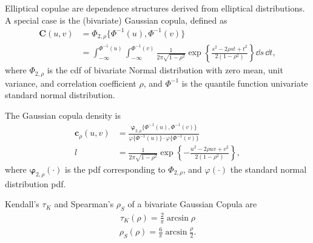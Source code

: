 Elliptical copulae are dependence structures derived from elliptical
distributions. A special case is the (bivariate) Gaussian copula,
defined as 
\begin{align}
  \bm{C}(u,v) &= \Phi_{2, \rho}\{\Phi^{-1}(u), \Phi^{-1}(v)\} \nonumber \\
              &= \int_{-\infty}^{\Phi^{-1}(u)}
                \int_{-\infty}^{\Phi^{-1}(v)}
                \frac{1}{2\pi\sqrt{1-\rho^2}}
                \exp{\left\{
                \frac{s^2-2\rho st+t^2}{2(1-\rho^2)}
                \right\}} \dd s\, \dd t,
\end{align}
where $\Phi_{2, \rho}$ is the cdf of bivariate Normal distribution
with zero mean, unit variance, and correlation coefficient $\rho$, and
$\Phi^{-1}$ is the quantile function univariate standard normal
distribution.  

The Gaussian copula density is
\begin{align}
  \bm{c}_\rho(u,v) &= \frac{\bm{\varphi}_{2,\rho}\{\Phi^{-1}(u), \Phi^{-1}(v)\}}
                     {\varphi\{\Phi^{-1}(u)\} \cdot \varphi\{\Phi^{-1}(v)\}} \nonumber \\[10pt]l
                   &= \frac{1}{2\pi\sqrt{1-\rho^2}}\exp\left\{
                     -\frac{u^2 - 2\rho uv + v^2}{2(1-\rho^2)}
                     \right\},
\end{align}
where $\bm{\varphi}_{2,\rho}(\cdot)$ is the pdf corresponding to
$\Phi_{2, \rho}$, and $\varphi(\cdot)$ the standard normal
distribution pdf.

Kendall's $\tau_K$ and Spearman's $\rho_S$ of a bivariate Gaussian
Copula are 
    \begin{align}
        \tau_K(\rho) = \frac{2}{\pi}\arcsin\rho
        \end{align}
    \begin{align}
        \rho_S(\rho) = \frac{6}{\pi}\arcsin\frac{\rho}{2}.
        \end{align}

